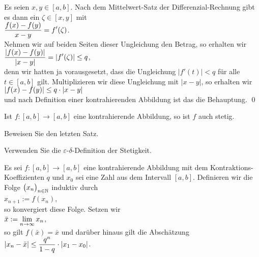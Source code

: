 \proof
Es seien $x, y \in [a,b]$.
Nach dem Mittelwert-Satz der Differenzial-Rechnung gibt es dann ein $\zeta\in[x,y]$ mit 
\\[0.2cm]
\hspace*{1.3cm}
$\displaystyle\frac{f(x) - f(y)}{x - y} = f'(\zeta)$.
\\[0.2cm]
Nehmen wir auf beiden Seiten dieser Ungleichung den Betrag, so erhalten wir
\\[0.2cm]
\hspace*{1.3cm}
$\displaystyle\frac{|f(x) - f(y)|}{|x - y|} = |f'(\zeta)| \leq q$,
\\[0.2cm]
denn wir hatten ja vorausgesetzt, dass die Ungleichung $|f'(t)| < q$ f\"ur alle
$t \in [a,b]$ gilt.  Multiplizieren wir diese Ungleichung mit $|x - y|$, so erhalten wir
\\[0.2cm]
\hspace*{1.3cm}
$\displaystyle |f(x) - f(y)| \leq q \cdot |x  - y|$
\\[0.2cm]
und nach Definition einer kontrahierenden Abbildung ist das die Behauptung.
\qed
\pagebreak

\begin{Satz}
  Ist $f:[a,b] \rightarrow [a,b]$ eine kontrahierende Abbildung, so ist $f$ auch stetig.
\end{Satz}

\exercise
Beweisen Sie den letzten Satz.

\hint
Verwenden Sie die $\varepsilon$-$\delta$-Definition der Stetigkeit.
\eox

\begin{Satz} \lb
Es sei $f:[a,b] \rightarrow [a,b]$ eine kontrahierende Abbildung mit dem
Kontraktions-Koeffizienten $q$ und $x_0$ sei eine Zahl aus dem Intervall $[a,b]$.  
Definieren wir die Folge $\bigl(x_n\bigr)_{n\in\mathbb{N}}$ induktiv durch
\\[0.2cm]
\hspace*{1.3cm} $x_{n+1} := f(x_n)$,
\\[0.2cm]
so konvergiert diese Folge.  Setzen wir 
\\[0.2cm]
\hspace*{1.3cm}
$\displaystyle\bar{x} := \lim\limits_{n\rightarrow\infty} x_n$,
\\[0.2cm]
so gilt $f(\bar{x}) = \bar{x}$ und dar\"uber hinaus gilt die Absch\"atzung 
\\[0.2cm]
\hspace*{1.3cm}
$\displaystyle |x_n - \bar{x}| \leq \frac{q^n}{1- q} \cdot  |x_1 - x_0|$.
\end{Satz}

